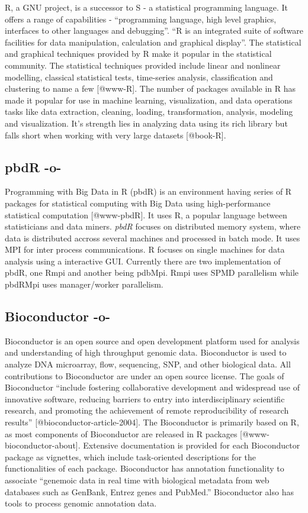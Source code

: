R, a GNU project, is a successor to S - a statistical programming
language. It offers a range of capabilities - ``programming language,
high level graphics, interfaces to other languages and
debugging''. ``R is an integrated suite of software facilities for
data manipulation, calculation and graphical display''. The
statistical and graphical techniques provided by R make it popular in
the statistical community. The statistical techniques provided include
linear and nonlinear modelling, classical statistical tests,
time-series analysis, classification and clustering to name a
few [@www-R]. The number of packages available in R has made it
popular for use in machine learning, visualization, and data
operations tasks like data extraction, cleaning, loading,
transformation, analysis, modeling and visualization. It's strength
lies in analyzing data using its rich library but falls short when
working with very large datasets [@book-R].
    
\subsection{pbdR -o-}

Programming with Big Data in R (pbdR) is an environment having series
of R packages for statistical computing with Big Data using
high-performance statistical computation [@www-pbdR]. It uses R, a
popular language between statisticians and data miners. \textit{pbdR} focuses
on distributed memory system, where data is distributed accross
several machines and processed in batch mode. It uses MPI for inter
process communications. R focuses on single machines for data analysis
using a interactive GUI. Currently there are two implementation of
pbdR, one Rmpi and another being pdbMpi.  Rmpi uses SPMD parallelism
while pbdRMpi uses manager/worker parallelism.



\subsection{Bioconductor -o-}

Bioconductor is an open source and open development platform used for
analysis and understanding of high throughput genomic
data. Bioconductor is used to analyze DNA microarray, flow,
sequencing, SNP, and other biological data. All contributions to
Bioconductor are under an open source license. The goals of
Bioconductor ``include fostering collaborative development and
widespread use of innovative software, reducing barriers to entry into
interdisciplinary scientific research, and promoting the achievement
of remote reproducibility of research
results'' [@bioconductor-article-2004].  The Bioconductor is
primarily based on R, as most components of Bioconductor are released
in R packages [@www-bioconductor-about].  Extensive documentation
is provided for each Bioconductor package as vignettes, which include
task-oriented descriptions for the functionalities of each
package. Bioconductor has annotation functionality to associate
``genemoic data in real time with biological metadata from web
databases such as GenBank, Entrez genes and PubMed.''  Bioconductor
also has tools to process genomic annotation data.



